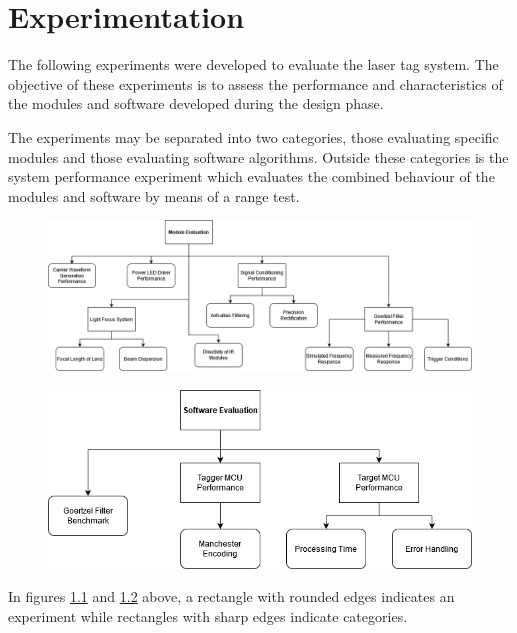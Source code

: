 \chapter{Experimentation}
\label{ch_experimentation}
The following experiments were developed to evaluate the laser tag system. The objective of these experiments is to assess the performance and characteristics of the modules and software developed during the design phase.

The experiments may be separated into two categories, those evaluating specific modules and those evaluating software algorithms. Outside these categories is the system performance experiment which evaluates the combined behaviour of the modules and software by means of a range test.

\begin{figure}[H]
	\centering
	\includegraphics[width=\linewidth]{figures/experimentation/experiments_overview_module_evaluation.png}
	\label{fig:experiments_overview_module_evaluation}
\end{figure}

\begin{figure}[H]
	\centering
	\includegraphics[width=.7\linewidth]{figures/experimentation/experiments_overview_software_evaluation.png}
	\label{fig:experiments_overview_software_evaluation}
\end{figure}

In figures \ref{fig:experiments_overview_module_evaluation} and \ref{fig:experiments_overview_software_evaluation} above, a rectangle with rounded edges indicates an experiment while rectangles with sharp edges indicate categories.




